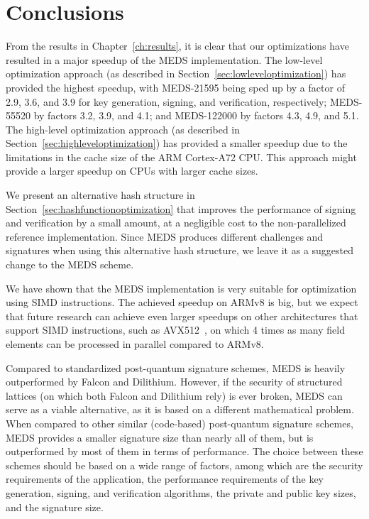 \documentclass[11pt,a4paper]{report}
\theoremstyle{definition}
\begin{document}
\chapter{Conclusions}
\label{ch:conclusion}
From the results in Chapter~\ref{ch:results}, it is clear that our optimizations have resulted in a major speedup of the MEDS implementation. The low-level optimization approach (as described in Section~\ref{sec:lowleveloptimization}) has provided the highest speedup, with MEDS-21595 being sped up by a factor of 2.9, 3.6, and 3.9 for key generation, signing, and verification, respectively; MEDS-55520 by factors 3.2, 3.9, and 4.1; and MEDS-122000 by factors 4.3, 4.9, and 5.1. The high-level optimization approach (as described in Section~\ref{sec:highleveloptimization}) has provided a smaller speedup due to the limitations in the cache size of the ARM Cortex-A72 CPU. This approach might provide a larger speedup on CPUs with larger cache sizes.

We present an alternative hash structure in Section~\ref{sec:hashfunctionoptimization} that improves the performance of signing and verification by a small amount, at a negligible cost to the non-parallelized reference implementation. Since MEDS produces different challenges and signatures when using this alternative hash structure, we leave it as a suggested change to the MEDS scheme.

We have shown that the MEDS implementation is very suitable for optimization using SIMD instructions. The achieved speedup on ARMv8 is big, but we expect that future research can achieve even larger speedups on other architectures that support SIMD instructions, such as AVX512~\cite{intel-avx512}, on which 4 times as many field elements can be processed in parallel compared to ARMv8.

Compared to standardized post-quantum signature schemes, MEDS is heavily outperformed by Falcon and Dilithium. However, if the security of structured lattices (on which both Falcon and Dilithium rely) is ever broken, MEDS can serve as a viable alternative, as it is based on a different mathematical problem. When compared to other similar (code-based) post-quantum signature schemes, MEDS provides a smaller signature size than nearly all of them, but is outperformed by most of them in terms of performance. The choice between these schemes should be based on a wide range of factors, among which are the security requirements of the application, the performance requirements of the key generation, signing, and verification algorithms, the private and public key sizes, and the signature size.
\end{document}
